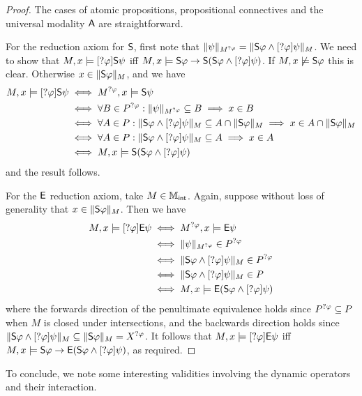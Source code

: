 \begin{proof}
The cases of atomic propositions, propositional connectives and the
universal modality $\A$ are straightforward.

For the reduction axiom for $\S$, first note that
$\|\psi\|_{M^{\sndann\phi}} = \|\S\phi \land
[\sndann\phi]\psi\|_M$. We need to show that $M, x \models
[\sndann\phi]\S\psi$ iff $M, x \models \S\phi \limplies \S(\S\phi
\land [\sndann\phi]\psi)$. If $M, x \not\models \S\phi$ this is
clear. Otherwise $x \in \|\S\phi\|_M$, and we have
\[
\begin{aligned}
   M, x \models [\sndann\phi]\S\psi
   &\iff M^{\sndann\phi}, x \models \S\psi \\
   &\iff \forall B \in P^{\sndann\phi}: \|\psi\|_{M^{\sndann\phi}}
   \subseteq B \implies x \in B \\
   &\iff \forall A \in P: \|\S\phi \land
       [\sndann\phi]\psi\|_M \subseteq A \cap
       \|\S\phi\|_M \implies x \in A \cap \|\S\phi\|_M \\
   &\iff \forall A \in P: \|\S\phi \land
       [\sndann\phi]\psi\|_M \subseteq A \implies x \in A \\
   &\iff M, x \models \S(\S\phi \land [\sndann\phi]\psi)
\end{aligned}\]
and the result follows.

For the $\E$ reduction axiom, take $M \in \Mint$. Again,
suppose without loss of generality that $x \in \|\S\phi\|_M$. Then
we have
\[
\begin{aligned}
   M, x \models [\sndann\phi]\E\psi
   &\iff M^{\sndann\phi}, x \models \E\psi \\
   &\iff \|\psi\|_{M^{\sndann\phi}} \in P^{\sndann\phi} \\
   &\iff \|\S\phi \land [\sndann\phi]\psi\|_M \in P^{\sndann\phi} \\
   &\iff \|\S\phi \land [\sndann\phi]\psi\|_M \in P \\
   &\iff M, x \models \E(\S\phi \land [\sndann\phi]\psi)
\end{aligned}\]
where the forwards direction of the penultimate equivalence holds since
$P^{\sndann\phi} \subseteq P$ when $M$ is closed under
intersections, and the backwards direction holds since $\|\S\phi
\land [\sndann\phi]\psi\|_M \subseteq \|\S\phi\|_M = X^{\sndann\phi}$. It
follows that $M, x \models [\sndann\phi]\E\psi$ iff $M, x
\models \S\phi \limplies \E(\S\phi \land [\sndann\phi]\psi)$, as
required.
\end{proof}

To conclude, we note some interesting validities involving the dynamic
operators and their interaction.

